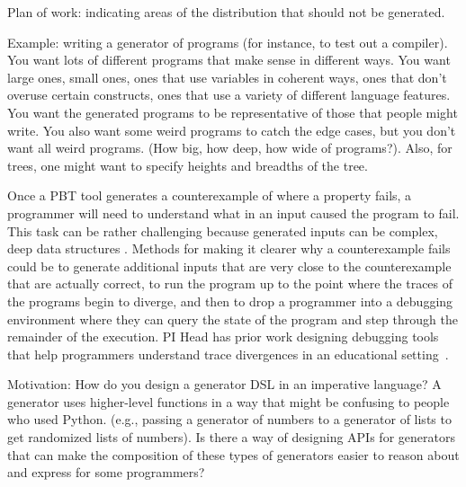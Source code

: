 
Plan of work: indicating areas of the distribution that should not be generated.

Example: writing a generator of programs (for instance, to test out a compiler). You want lots of different programs that make sense in different ways. You want large ones, small ones, ones that use variables in coherent ways, ones that don’t overuse certain constructs, ones that use a variety of different language features. You want the generated programs to be representative of those that people might write. You also want some weird programs to catch the edge cases, but you don’t want all weird programs. (How big, how deep, how wide of programs?). Also, for trees, one might want to specify heights and breadths of the tree.


Once a PBT tool generates a counterexample of where a property fails, a programmer will need to understand what in an input caused the program to fail. This task can be rather challenging because generated inputs can be complex, deep data structures . Methods for making it clearer why a counterexample fails could be to generate additional inputs that are very close to the counterexample that are actually correct, to run the program up to the point where the traces of the programs begin to diverge, and then to drop a programmer into a debugging environment where they can query the state of the program and step through the remainder of the execution. PI Head has prior work designing debugging tools that help programmers understand trace divergences in an educational setting~\cite{suzuki2017tracediff}.   


Motivation: How do you design a generator DSL in an imperative language? A generator uses higher-level functions in a way that might be confusing to people who used Python.  (e.g., passing a generator of numbers to a generator of lists to get randomized lists of numbers). Is there a way of designing APIs for generators that can make the composition of these types of generators easier to reason about and express for some programmers?

